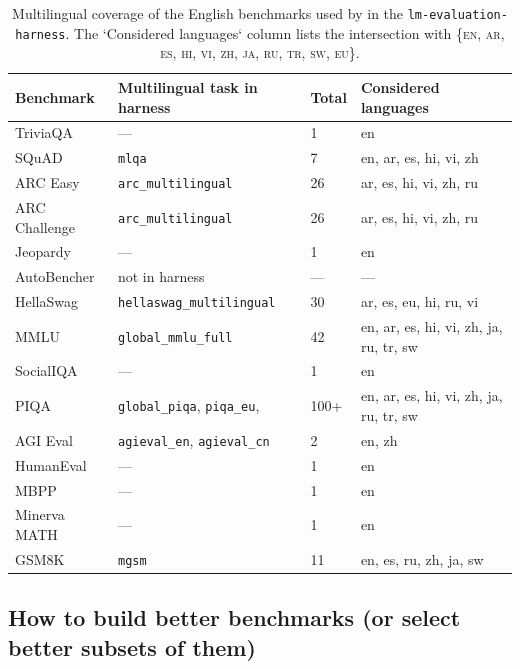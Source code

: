 \documentclass{article}
\begin{document}
\begin{table}[ht]
\centering
\caption{
  Multilingual coverage of the English benchmarks used by \cite{heineman2025signalnoiseframeworkreducing} in the
  \texttt{lm-evaluation-harness}.
  The `Considered languages` column lists the intersection with
  \{\textsc{en, ar, es, hi, vi, zh, ja, ru, tr, sw, eu}\}.
}
\label{tab:multilingual-benchmarks}
\small
\begin{tabular}{llll}
\toprule
\textbf{Benchmark}
  & \textbf{Multilingual task in harness}
  & \textbf{Total}
  & \textbf{Considered languages} \\
\midrule
TriviaQA
  & ---
  & 1
  & en \\
\addlinespace
SQuAD
  & \texttt{mlqa}
  & 7
  & en, ar, es, hi, vi, zh \\
\addlinespace
ARC Easy
  & \texttt{arc\_multilingual}
  & 26
  & ar, es, hi, vi, zh, ru \\
\addlinespace
ARC Challenge
  & \texttt{arc\_multilingual}
  & 26
  & ar, es, hi, vi, zh, ru \\
\addlinespace
Jeopardy
  & ---
  & 1
  & en \\
\addlinespace
AutoBencher
  & not in harness
  & ---
  & --- \\
\addlinespace
HellaSwag
  & \texttt{hellaswag\_multilingual}
  & 30
  & ar, es, eu, hi, ru, vi \\
\addlinespace
MMLU
  & \texttt{global\_mmlu\_full}
  & 42
  & en, ar, es, hi, vi, zh, ja, ru, tr, sw \\
\addlinespace
SocialIQA
  & ---
  & 1
  & en \\
\addlinespace
PIQA
  & \texttt{global\_piqa},
    \texttt{piqa\_eu},
  & 100+
  & en, ar, es, hi, vi, zh, ja, ru, tr, sw \\
\addlinespace
AGI Eval
  & \texttt{agieval\_en}, \texttt{agieval\_cn}
  & 2
  & en, zh \\
\addlinespace
HumanEval
  & ---
  & 1
  & en \\
\addlinespace
MBPP
  & ---
  & 1
  & en \\
\addlinespace
Minerva MATH
  & ---
  & 1
  & en \\
\addlinespace
GSM8K
  & \texttt{mgsm}
  & 11
  & en, es, ru, zh, ja, sw \\
\bottomrule
\end{tabular}
\end{table}


\subsection{How to build better benchmarks (or select better subsets of them)}
\end{document}
